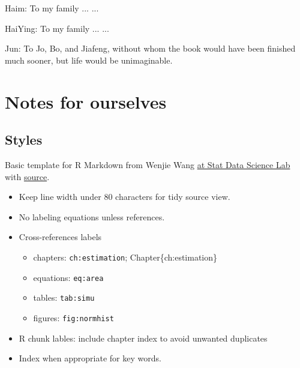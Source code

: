 \thispagestyle{empty}

\begin{center}
  Haim: To my family ... ...
  

  \bigskip

  HaiYing: To my family ... ...

  \bigskip

  Jun: To Jo, Bo, and Jiafeng, without whom the book would have been finished
  much sooner, but life would be unimaginable.
  
\end{center}


{
\hypersetup{linkcolor=}
\setcounter{tocdepth}{2}
\tableofcontents
}

\hypertarget{notes-for-ourselves}{%
\chapter*{Notes for ourselves}\label{notes-for-ourselves}}


\hypertarget{styles}{%
\section*{Styles}\label{styles}}


Basic template for R Markdown from Wenjie Wang
\href{https://statds.org/template/}{at Stat Data Science Lab} with
\href{https://github.com/statds/dslab-templates/}{source}.

\begin{itemize}
\tightlist
\item
  Keep line width under 80 characters for tidy source view.
\item
  No labeling equations unless references.
\item
  Cross-references labels

  \begin{itemize}
  \tightlist
  \item
    chapters: \texttt{ch:estimation}; Chapter\textasciitilde@ref\{ch:estimation\}
  \item
    equations: \texttt{eq:area}
  \item
    tables: \texttt{tab:simu}
  \item
    figures: \texttt{fig:normhist}
  \end{itemize}
\item
  R chunk lables: include chapter index to avoid unwanted duplicates
\item
  Index when appropriate for key words.
\end{itemize}

